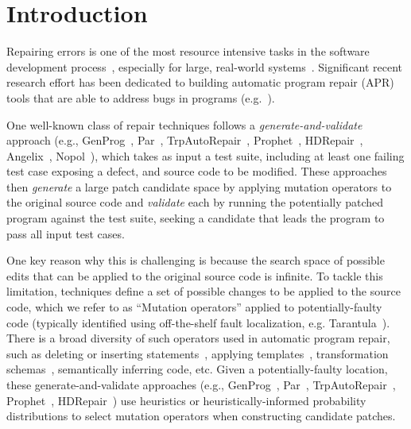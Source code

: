 \documentclass[conference]{IEEEtran}
\begin{document}
%
\IEEEpeerreviewmaketitle



\section{Introduction} \label{introduction}

Repairing errors is one of the most 
resource intensive tasks in 
the software development process~\cite{Weiss07,Tassey02,Britton13}, especially for large, real-world systems~\cite{Liblit03,Anvik05}.
%
Significant recent research effort has been dedicated to
building automatic program repair (APR) tools that are able to address
bugs in 
programs (e.g.~\cite{legoues12,kim2013,Weimer13,long15SPR,long16proph,debroy10,perkins09,wei10}).

One well-known class of repair techniques follows a 
\emph{generate-and-validate} approach (e.g., GenProg~\cite{legoues12}, 
Par~\cite{kim2013}, TrpAutoRepair~\cite{Qi13TrpAutoR},
Prophet~\cite{long16proph}, HDRepair~\cite{xuan16}, Angelix~\cite{Mechtaev2016},
Nopol~\cite{xuanNopol}), which takes as input a test suite, 
including at
least one failing test case exposing
a defect, and source code to be 
modified.  These approaches then \emph{generate} a large patch candidate space 
by applying 
mutation operators to the original source code and \emph{validate} each by
running the potentially patched program against the test suite, seeking a candidate that
leads the program to pass all input test cases. 

One key reason why this is challenging is because the search space of possible edits that can be applied to the original source code is infinite. To tackle this limitation, techniques define a set of possible changes to be
applied to the source code, which we refer to as ``Mutation operators'' applied to potentially-faulty code (typically identified using off-the-shelf fault 
localization, e.g. Tarantula~\cite{Jones02}). 
There is a broad diversity of such operators used in automatic program repair, such as deleting or inserting 
statements~\cite{legoues12}, applying templates~\cite{kim2013}, transformation 
schemas~\cite{long16proph,long15SPR}, semantically inferring code\cite{nguyen13,Mechtaev2016,xuanNopol}, etc.
Given a potentially-faulty location, these
generate-and-validate approaches (e.g., GenProg~\cite{legoues12}, 
Par~\cite{kim2013}, TrpAutoRepair~\cite{Qi13TrpAutoR},
Prophet~\cite{long16proph}, HDRepair~\cite{xuan16}) use heuristics or
heuristically-informed probability distributions to select
mutation operators
when constructing candidate patches.
\end{document}
